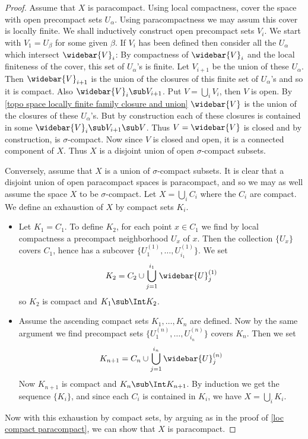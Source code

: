 \begin{proof}
Assume that $X$ is paracompact. Using local compactness, cover the space with open precompact sets $U_\alpha$. Using paracompactness we may assum this cover is locally finite. We shall inductively construct open precompact sets $V_i$. We start with $V_1=U_\beta$ for some given $\beta$. If $V_i$ has been defined then consider all the $U_\alpha$ which intersect $\widebar{V}_i$: By compactness of $\widebar{V}_i$ and the local finiteness of the cover, this set of $U_\alpha$'s is finite. Let $V_{i+1}$ be the union of these $U_\alpha$. Then $\widebar{V}_{i+1}$ is the union of the closures of this finite set of $U_\alpha$'s and so it is compact. Also $\widebar{V}_i\sub V_{i+1}$. Put $V=\bigcup_iV_i$, then $V$ is open. By \cref{topo space locally finite family closure and union} $\widebar{V}$ is the union of the closures of these $U_\alpha$'s. But by construction each of these closures is contained in some $\widebar{V}_i\sub V_{i+1}\sub V$. Thus $V=\widebar{V}$ is closed and by construction, is $\sigma$-compact. Now since $V$ is closed and open, it is a connected component of $X$. Thus $X$ is a disjoint union of open $\sigma$-compact subsets.\par
Conversely, assume that $X$ is a union of $\sigma$-compact subsets. It is clear that a disjoint union of open paracompact spaces is paracompact, and so we may as well assume the space $X$ to be $\sigma$-compact. Let $X=\bigcup_iC_i$ where the $C_i$ are compact. We define an exhaustion of $X$ by compact sets $K_i$.
\begin{itemize}
\item Let $K_1=C_1$. To define $K_2$, for each point $x\in C_1$ we find by local compactness a precompact neighborhood $U_x$ of $x$. Then the collection $\{U_x\}$ covers $C_1$, hence has a subcover $\{U^{(1)}_{1},\dots,U^{(1)}_{i_1}\}$. We set
\[K_2=C_2\cup\bigcup_{j=1}^{i_1}\widebar{U}^{(1)}_j\]
so $K_2$ is compact and $K_1\sub\Int K_2$.
\item Assume the ascending compact sets $K_1,\dots,K_n$ are defined. Now by the same argument we find precompact sets $\{U^{(n)}_1,\dots,U^{(n)}_{i_n}\}$ covers $K_n$. Then we set
\[K_{n+1}=C_n\cup\bigcup_{j=1}^{i_n}\widebar{U}_j^{(n)}\] 
Now $K_{n+1}$ is compact and $K_n\sub\Int K_{n+1}$. By induction we get the sequence $\{K_i\}$, and since each $C_i$ is contained in $K_i$, we have $X=\bigcup_iK_i$.
\end{itemize}
Now with this exhaustion by compact sets, by arguing as in the proof of \cref{loc compact paracompact}, we can show that $X$ is paracompact.
\end{proof}
